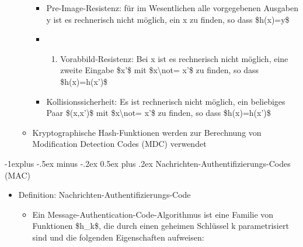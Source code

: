 \documentclass[a4paper]{article}
\makeatletter
\renewcommand{\subsection}{\@startsection{subsection}{2}{0mm}%
 {-1explus -.5ex minus -.2ex}%
 {0.5ex plus .2ex}%
 {\normalfont\normalsize\bfseries}}
\makeatother
\begin{document}
\begin{multicols}{3}
\begin{itemize}
\begin{itemize}
                        \begin{itemize}
                            \item
                                  Pre-Image-Resistenz: für im Wesentlichen alle vorgegebenen
                                  Ausgaben y ist es rechnerisch nicht möglich, ein x zu finden, so
                                  dass \$h(x)=y\$
                            \item
                                  \begin{enumerate}
                                      \def\labelenumi{\arabic{enumi}.}
                                      \setcounter{enumi}{1}
                                      \item
                                            Vorabbild-Resistenz: Bei x ist es rechnerisch nicht möglich,
                                            eine zweite Eingabe \$x'\$ mit \$x\textbackslash not= x'\$ zu
                                            finden, so dass \$h(x)=h(x')\$
                                  \end{enumerate}
                            \item
                                  Kollisionssicherheit: Es ist rechnerisch nicht möglich, ein
                                  beliebiges Paar \$(x,x')\$ mit \$x\textbackslash not= x'\$ zu
                                  finden, so dass \$h(x)=h(x')\$
                        \end{itemize}
                  \item
                        Kryptographische Hash-Funktionen werden zur Berechnung von
                        Modification Detection Codes (MDC) verwendet
              \end{itemize}
    \end{itemize}


    \subsection{Nachrichten-Authentifizierungs-Codes
        (MAC)}

    \begin{itemize}
        \item
              Definition: Nachrichten-Authentifizierungs-Code

              \begin{itemize}
                  \item
                        Ein Message-Authentication-Code-Algorithmus ist eine Familie von
                        Funktionen \$h\_k\$, die durch einen geheimen Schlüssel k
                        parametrisiert sind und die folgenden Eigenschaften aufweisen:


\end{itemize}
\end{itemize}
\end{multicols}
\end{document}
